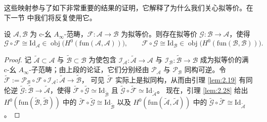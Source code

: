 这些映射参与了如下非常重要的结果的证明，它解释了为什么我们关心拟等价。在下一节
中我们将反复使用它。

\begin{Thm}\label{thm:2.31}
设 $\mathcal A,\mathcal B$ 为 c-幺 $A_\infty$-范畴，$\mathcal F:\mathcal A\to
\mathcal B$ 为拟等价。则存在拟等价 $\mathcal G:\mathcal B\to\mathcal A$，使得
\[
  \mathcal G\circ\mathcal F\cong\mathrm{Id}_{\mathcal A}
  \in\operatorname{obj}\bigl(H^0(\mathrm{fun}(\mathcal A,\mathcal A))\bigr),
  \qquad
  \mathcal F\circ\mathcal G\cong\mathrm{Id}_{\mathcal B}
  \in\operatorname{obj}\bigl(H^0(\mathrm{fun}(\mathcal B,\mathcal B))\bigr).
\]
\end{Thm}

\begin{proof}
记 $\tilde{\mathcal A}\subset\mathcal A$ 与 $\tilde{\mathcal B}\subset\mathcal B$
为使包含 $\mathcal I_{\mathcal A}:\tilde{\mathcal A}\to\mathcal A$ 与
$\mathcal I_{\mathcal B}:\tilde{\mathcal B}\to\mathcal B$ 成为拟等价的满 c-幺
$A_\infty$-子范畴；由上段的论证，它们分别经由 $\mathcal P_{\mathcal A}$ 与
$\mathcal P_{\mathcal B}$ 同构可逆。令 $\tilde{\mathcal F}:=\mathcal P_{\mathcal B}
\circ\mathcal F\circ\mathcal I_{\mathcal A}:\tilde{\mathcal A}\to\tilde{\mathcal B}$，
可见 $\tilde{\mathcal F}$ 实际上是拟同构，从而由引理 \ref{lem:2.19} 有同伦逆
$\tilde{\mathcal G}:\tilde{\mathcal B}\to\tilde{\mathcal A}$，使得
$\tilde{\mathcal F}\circ\tilde{\mathcal G}\simeq\mathrm{Id}_{\tilde{\mathcal B}}$
且 $\tilde{\mathcal G}\circ\tilde{\mathcal F}\simeq\mathrm{Id}_{\tilde{\mathcal A}}$。
现在，引理 \ref{lem:2.28} 给出 $H^0(\mathrm{fun}(\tilde{\mathcal B},\tilde{\mathcal B}))$ 中的
$\tilde{\mathcal F}\circ\tilde{\mathcal G}\cong\mathrm{Id}_{\tilde{\mathcal B}}$
以及 $H^0(\mathrm{fun}(\tilde{\mathcal A},\tilde{\mathcal A}))$ 中的
$\tilde{\mathcal G}\circ\tilde{\mathcal F}\cong\mathrm{Id}_{\tilde{\mathcal A}}$。
\end{proof}

